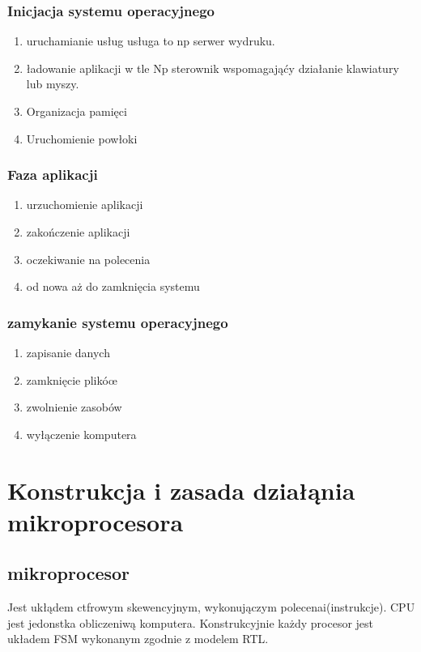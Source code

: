 \documentclass[11pt]{article}
\begin{document}
\subsubsection{Inicjacja systemu operacyjnego}
\label{sec:org5179268}
\begin{enumerate}
\item uruchamianie usług
\label{sec:org4fcc2fe}
usługa to np serwer wydruku.
\item ładowanie aplikacji w tle
\label{sec:orgd4430c5}
Np sterownik wspomagająćy działanie klawiatury lub myszy.
\item Organizacja pamięci
\label{sec:orgea28136}
\item Uruchomienie powłoki
\label{sec:orgf29f8ef}
\end{enumerate}
\subsubsection{Faza aplikacji}
\label{sec:org3ee07a6}
\begin{enumerate}
\item urzuchomienie aplikacji
\item zakończenie aplikacji
\item oczekiwanie na polecenia
\item od nowa aż do zamknięcia systemu
\end{enumerate}
\subsubsection{zamykanie systemu operacyjnego}
\label{sec:org9cf0c15}
\begin{enumerate}
\item zapisanie danych
\label{sec:org3bce0c8}
\item zamknięcie plikóœ
\label{sec:org678d203}
\item zwolnienie zasobów
\label{sec:org34f4641}
\item wyłączenie komputera
\label{sec:orgc5a4b7c}
\end{enumerate}
\section{Konstrukcja i zasada działąnia mikroprocesora}
\label{sec:org6381023}
\subsection{mikroprocesor}
\label{sec:org8eec540}
Jest ukłądem ctfrowym skewencyjnym, wykonujączym polecenai(instrukcje). CPU jest jedonstka obliczeniwą komputera.
Konstrukcyjnie każdy procesor jest układem FSM wykonanym zgodnie z modelem RTL.
\end{document}
